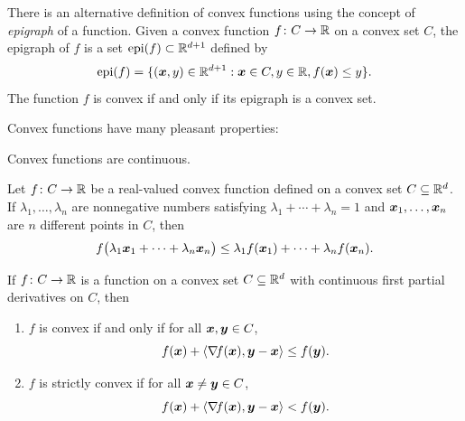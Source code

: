 \begin{remark}
There is an alternative definition of convex functions using the concept of \emph{epigraph} of a function.  Given a convex function $f\colon C \to \mathbb{R}$ on a convex set $C$, the epigraph of $f$ is a set $\operatorname{epi}(f) \subset \mathbb{R}^{d+1}$ defined by
\begin{equation*}
\operatorname{epi}(f) = \{ (\boldsymbol{x},y) \in \mathbb{R}^{d+1} : \boldsymbol{x} \in C, y \in \mathbb{R}, f(\boldsymbol{x}) \leq y \}.
\end{equation*}
The function $f$ is convex if and only if its epigraph is a convex set.
\end{remark}

\separator

Convex functions have many pleasant properties:
\begin{theorem}\label{theorem:ConvexIsContinuous}
Convex functions are continuous.
\end{theorem}

\begin{theorem}
Let $f\colon C \to \mathbb{R}$ be a real-valued convex function defined on a convex set $C \subseteq \mathbb{R}^d$.  If $\lambda_1, \dotsc, \lambda_n$ are nonnegative numbers satisfying $\lambda_1 + \dotsb + \lambda_n = 1$ and $\boldsymbol{x}_1, \dotsc, \boldsymbol{x}_n$ are $n$ different points in $C$, then
\begin{equation*}
f\big( \lambda_1 \boldsymbol{x}_1 + \dotsb + \lambda_n \boldsymbol{x}_n \big) \leq \lambda_1 f(\boldsymbol{x}_1) + \dotsb + \lambda_n f(\boldsymbol{x}_n).
\end{equation*}
\end{theorem}

\begin{theorem}\label{theorem:convexAboveTangentHyperplane}
If $f\colon C \to \mathbb{R}$ is a function on a convex set $C \subseteq \mathbb{R}^d$ with continuous first partial derivatives on $C$, then
\begin{enumerate}
	\item $f$ is convex if and only if for all $\boldsymbol{x}, \boldsymbol{y} \in C$,
	\begin{equation*}
	f(\boldsymbol{x}) + \langle \mathop{\nabla\! {f}}(\boldsymbol{x}), \boldsymbol{y} - \boldsymbol{x} \rangle \leq f(\boldsymbol{y}).
	\end{equation*}
	\item $f$ is strictly convex if for all $\boldsymbol{x} \neq \boldsymbol{y} \in C$,
	\begin{equation*}
	f(\boldsymbol{x}) + \langle \mathop{\nabla\! {f}}(\boldsymbol{x}), \boldsymbol{y} - \boldsymbol{x} \rangle < f(\boldsymbol{y}).
	\end{equation*}
\end{enumerate}
\end{theorem}

